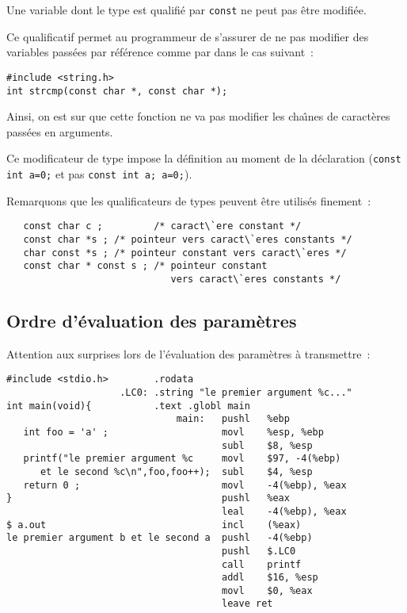 \begin{frame}[fragile]
  Une variable dont le type est qualifi\'e par \verb+const+ ne peut pas \^etre modifi\'ee.
  \par\smallskip
  Ce qualificatif permet au programmeur de s'assurer de ne pas modifier des variables
  pass\'ees par r\'ef\'erence comme par dans le cas suivant~:
\begin{verbatim}
#include <string.h>
int strcmp(const char *, const char *);
\end{verbatim}
  Ainsi, on est sur que cette fonction ne va pas modifier les cha\^\i{}nes de caract\`eres
  pass\'ees en arguments.
  \par\smallskip
  Ce modificateur de type impose la d\'efinition au moment de la
  d\'eclaration (\verb+const int a=0;+ et pas \verb+const int a; a=0;+).
  \par\smallskip
  Remarquons que les qualificateurs de types peuvent \^etre utilis\'es finement~:
\begin{verbatim}
   const char c ;         /* caract\`ere constant */
   const char *s ; /* pointeur vers caract\`eres constants */
   char const *s ; /* pointeur constant vers caract\`eres */
   const char * const s ; /* pointeur constant 
                             vers caract\`eres constants */
\end{verbatim}

\end{frame}
\begin{frame}[fragile]
  \section{Ordre d'\'evaluation des param\`etres}%
  Attention aux surprises lors de l'\'evaluation des param\`etres \`a
  transmettre~:
\begin{verbatim}
#include <stdio.h>        .rodata 
                    .LC0: .string "le premier argument %c..."    
int main(void){           .text .globl main        
                              main:   pushl   %ebp  
   int foo = 'a' ;                    movl    %esp, %ebp 
                                      subl    $8, %esp        
   printf("le premier argument %c     movl    $97, -4(%ebp)   
      et le second %c\n",foo,foo++);  subl    $4, %esp 
   return 0 ;                         movl    -4(%ebp), %eax 
}                                     pushl   %eax             
                                      leal    -4(%ebp), %eax 
$ a.out                               incl    (%eax)         
le premier argument b et le second a  pushl   -4(%ebp)  
                                      pushl   $.LC0    
                                      call    printf       
                                      addl    $16, %esp         
                                      movl    $0, %eax 
                                      leave ret     
\end{verbatim}
\end{frame}
